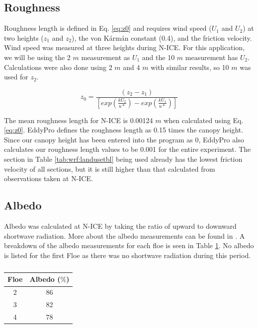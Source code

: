 \subsection{Roughness}

Roughness length is defined in Eq. \ref{eq:z0} and requires wind speed ($U_{1}$ and $U_{2}$) at two heights ($z_{1}$ and $z_{2}$), the von K\'{a}rm\'{a}n constant (0.4), and the friction velocity. Wind speed was measured at three heights during N-ICE. For this application, we will be using the 2 $m$ measurement as $U_{1}$ and the 10 $m$ measurement has $U_{2}$. Calculations were also done using 2 $m$ and 4 $m$ with similar results, so 10 $m$ was used for $z_{2}$.

\begin{equation}\label{eq:z0}
 z_{0} = \frac{(z_{2}-z_{1})}{[exp(\frac{kU_{2}}{u*}) - exp(\frac{kU_{1}}{u*})]} 
\end{equation}

The mean roughness length for N-ICE is 0.00124 $m$ when calculated using Eq. \ref{eq:z0}. EddyPro defines the roughness length as 0.15 times the canopy height. Since our canopy height has been entered into the program as 0, EddyPro also calculates our roughness length values to be 0.001 for the entire experiment. The section in Table \ref{tab:wrf:landusetbl} being used already has the lowest friction velocity of all sections, but it is still higher than that calculated from observations taken at N-ICE. 

\subsection{Albedo}

Albedo was calculated at N-ICE by taking the ratio of upward to downward shortwave radiation. More about the albedo measurements can be found in \citet{walden:2017}. A breakdown of the albedo measurements for each floe is seen in Table \ref{tab:albedos}. No albedo is listed for the first Floe as there was no shortwave radiation during this period. 

\begin{table}[H]
\centering
\footnotesize
{
\begin{tabular}{| c | c |}
 \hline
\textbf{Floe} & \textbf{Albedo ($\%$)} \\
\hline
2 & 86 \\
3 & 82 \\
4 & 78 \\
 \hline
\end{tabular}}
\caption{}
\label{tab:albedos}
\end{table}

